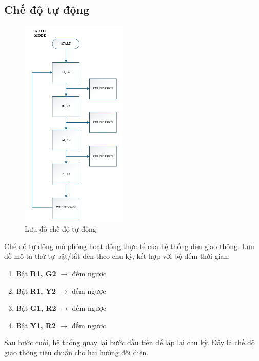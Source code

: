 \subsection{Chế độ tự động}
\begin{figure}[H]
    \centering
    \includegraphics[width=0.45\textwidth]{pictures/auto.png}
    \caption{Lưu đồ chế độ tự động}
\end{figure}
\cleardoublepage
Chế độ tự động mô phỏng hoạt động thực tế của hệ thống đèn giao thông. Lưu đồ mô tả thứ tự bật/tắt đèn theo chu kỳ, kết hợp với bộ đếm thời gian:
\begin{enumerate}
    \item Bật \textbf{R1, G2} $\rightarrow$ đếm ngược
    \item Bật \textbf{R1, Y2} $\rightarrow$ đếm ngược
    \item Bật \textbf{G1, R2} $\rightarrow$ đếm ngược
    \item Bật \textbf{Y1, R2} $\rightarrow$ đếm ngược
\end{enumerate}


Sau bước cuối, hệ thống quay lại bước đầu tiên để lặp lại chu kỳ. Đây là chế độ giao thông tiêu chuẩn cho hai hướng đối diện.
